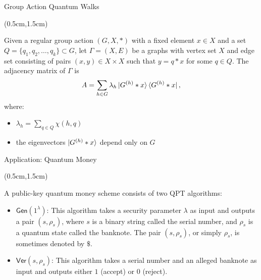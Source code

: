 \documentclass{beamer}
\theoremstyle{definition}
\newcommand{\gen}{\mathsf{Gen}}
\newcommand{\ver}{\mathsf{Ver}}
\begin{document}
\begin{frame}{Group Action Quantum Walks}
    
    \begin{textblock*}{12cm}(0.5cm,1.5cm)
               
        Given a regular group action $(G, X, *)$ with a fixed element $x \in X$ and a set  $Q = \{q_1, q_2, \dots, q_k\} \subset G$, let $\Gamma = (X, E)$ be a graphs with vertex set $X$ and edge set consisting of pairs $(x, y) \in X \times X$ such that $y = q * x$ for some $q \in Q$. The adjacency matrix of $\Gamma$ is
        \[ A = \sum_{h \in G} \lambda_h \ket{G^{(h)} * x} \bra{G^{(h)} * x}, \]
        where:
        \begin{itemize}
            \item $\lambda_h = \sum_{q \in Q} \chi(h, q)$
            \item the eigenvectors $\ket{G^{(h)} * x}$ depend only on $G$
        \end{itemize}

    \end{textblock*}

\end{frame}






\begin{frame}{Application: Quantum Money}
    
    \begin{textblock*}{12cm}(0.5cm,1.5cm)
            
        A public-key quantum money scheme consists of two QPT algorithms:
        \vspace{1cm} 
        \begin{itemize}
        \item $\gen(1^\lambda)$: This algorithm takes a security parameter $\lambda$ as input and outputs a pair $(s, \rho_s)$, where $s$ is a binary string called the serial number, and $\rho_s$ is a quantum state called the banknote. The pair $(s, \rho_s)$, or simply $\rho_s$, is sometimes denoted by $\$$.
        
        \vspace{1cm}
        \item $\ver(s, \rho_s)$: This algorithm takes a serial number and an alleged banknote as input and outputs either $1$ (accept) or $0$ (reject).
        \end{itemize}

    \end{textblock*}


\end{frame}
\end{document}

